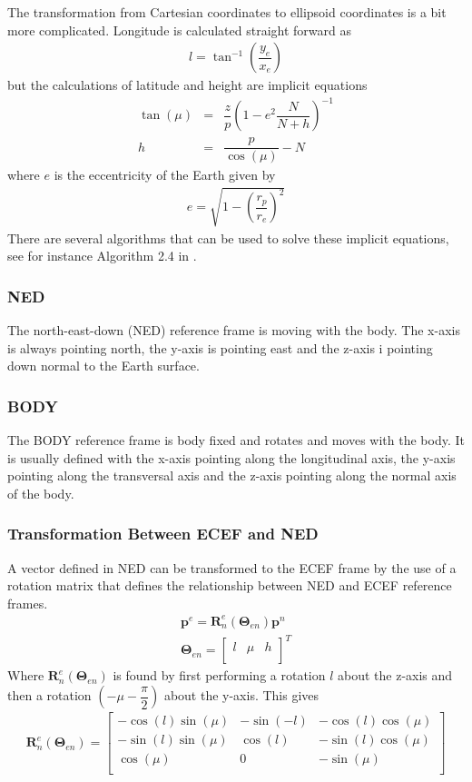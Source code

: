 The transformation from Cartesian coordinates to ellipsoid coordinates is a bit more complicated. Longitude is calculated straight forward as
\begin{eqnarray}
l = \tan ^{-1} (\dfrac{y_e}{x_e})
\end{eqnarray}
but the calculations of latitude  and height are implicit equations
\begin{eqnarray}
\tan(\mu) &=& \dfrac{z}{p}(1 - e^2\dfrac{N}{N + h})^{-1}\\
h &=& \dfrac{p}{\cos(\mu)} - N
\end{eqnarray}
where $e$ is the eccentricity of the Earth given by
\begin{eqnarray}
e = \sqrt{1 - (\dfrac{r_p}{r_e})^2}
\end{eqnarray}
There are several algorithms that can be used to solve these implicit equations, see for instance Algorithm 2.4 in \citep{Fossen}.
\subsubsection{NED}
The north-east-down (NED) reference frame is moving with the body. The x-axis is always pointing north, the y-axis is pointing east and the z-axis i pointing down normal to the Earth surface.
\subsubsection{BODY}
The BODY reference frame is body fixed and rotates and moves with the body. It is usually defined with the x-axis pointing along the longitudinal axis, the y-axis pointing along the transversal axis and the z-axis pointing along the normal axis of the body.
\subsubsection{Transformation Between ECEF and NED}
A vector defined in NED can be transformed to the ECEF frame by the use of a rotation matrix that defines the relationship between NED and ECEF reference frames.
\begin{eqnarray}
\boldsymbol{p}^e = \boldsymbol{R}_n^e(\boldsymbol{\Theta} _{en})\boldsymbol{p}^n\\
\boldsymbol{\Theta} _{en} = \begin{bmatrix}
l & \mu & h\\
\end{bmatrix}^T
\label{ecef}
\end{eqnarray}
Where $\boldsymbol{R}_n^e(\boldsymbol{\Theta} _{en})$ is found by first performing a rotation $l$ about the z-axis and then a rotation $(-\mu -\dfrac{\pi}{2})$ about the y-axis. This gives
\begin{eqnarray}
\boldsymbol{R} _n^e(\boldsymbol{\Theta} _{en}) = \begin{bmatrix}
-\cos(l)\sin(\mu) & -\sin(-l) & -\cos(l)\cos(\mu)\\
-\sin(l)\sin(\mu) & \cos(l) & -\sin(l)\cos(\mu)\\
\cos(\mu) & 0  & -\sin(\mu)\\
\end{bmatrix} 
\end{eqnarray}
